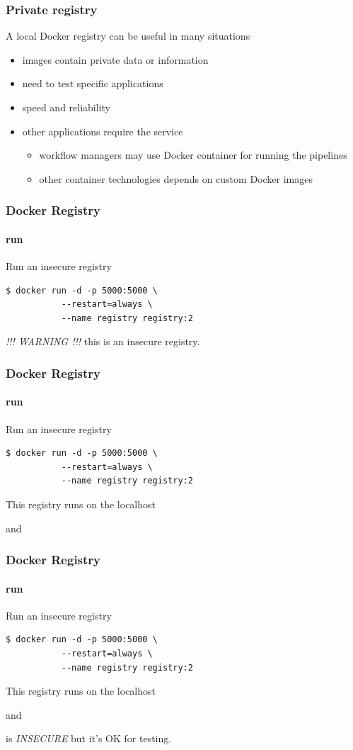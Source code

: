 \begin{frame}
\frametitle{Private registry}

A local Docker registry can be useful in many situations

\begin{itemize}
\item images contain private data or information
\item need to test specific applications
\item speed and reliability
\item other applications require the service
  \begin{itemize}
  \item workflow managers may use Docker container for running the pipelines
  \item other container technologies depends on custom Docker images
  \end{itemize}
\end{itemize}
\end{frame}


\begin{frame}[fragile]
\frametitle{Docker Registry}
\framesubtitle{run}
Run an insecure registry

\begin{lstlisting}
$ docker run -d -p 5000:5000 \
           --restart=always \
		   --name registry registry:2
\end{lstlisting}

\textit{!!! WARNING !!!} this is an insecure registry.
\end{frame}

\begin{frame}[fragile]
\frametitle{Docker Registry}
\framesubtitle{run}
Run an insecure registry

\begin{lstlisting}
$ docker run -d -p 5000:5000 \
           --restart=always \
		   --name registry registry:2
\end{lstlisting}

This registry runs on the localhost

and
\end{frame}

\begin{frame}[fragile]
\frametitle{Docker Registry}
\framesubtitle{run}
Run an insecure registry

\begin{lstlisting}
$ docker run -d -p 5000:5000 \
           --restart=always \
		   --name registry registry:2
\end{lstlisting}
This registry runs on the localhost

and

is \textit{INSECURE} but it's OK for testing.
\end{frame}

